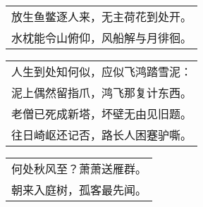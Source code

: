 \nopagebreak%
\nopagebreak%
\noindent\begin{minipage}{\linewidth}
  \vskip-3pt\begin{table}[H]
    \centering
    \begin{tabular}{@{}l@{}}
放生鱼鳖逐人来，无主荷花到处开。\\
水枕能令山俯仰，风船解与月徘徊。
    \end{tabular}
  \end{table}
\end{minipage}
\vspace{1cm}


\nopagebreak%
\nopagebreak%
\noindent\begin{minipage}{\linewidth}
  \vskip-3pt\begin{table}[H]
    \centering
    \begin{tabular}{@{}l@{}}
人生到处知何似，应似飞鸿踏雪泥：\\
泥上偶然留指爪，鸿飞那复计东西。\\
老僧已死成新塔，坏壁无由见旧题。\\
往日崎岖还记否，路长人困蹇驴嘶。
    \end{tabular}
  \end{table}
\end{minipage}
\vspace{1cm}


\nopagebreak%
\nopagebreak%
\noindent\begin{minipage}{\linewidth}
  \vskip-3pt\begin{table}[H]
    \centering
    \begin{tabular}{@{}l@{}}
何处秋风至？萧萧送雁群。\\
朝来入庭树，孤客最先闻。
    \end{tabular}
  \end{table}
\end{minipage}
\vspace{1cm}


